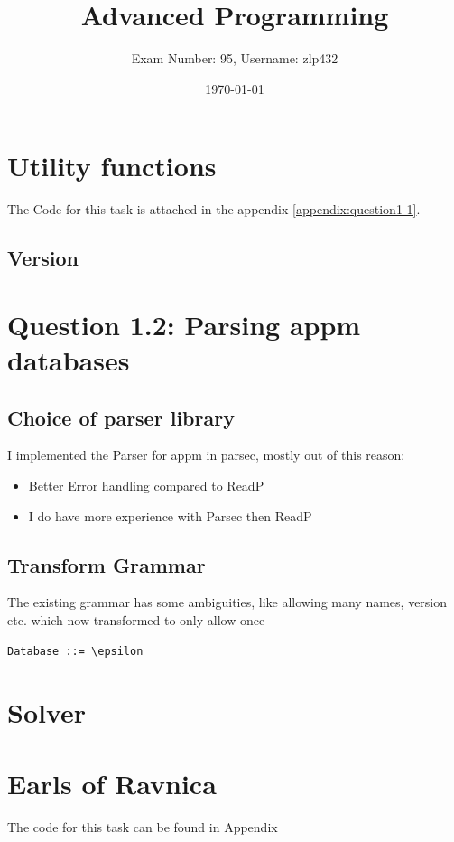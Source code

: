 \documentclass[12pt,a4paper]{article}
\newcommand{\subtitle}[1]{%
  \posttitle{%
    \par\end{center}
    \begin{center}\large#1\end{center}
    \vskip0.5em}%
}
\begin{document}
\title{Advanced Programming}
\subtitle{Exam 2018}

\author{Exam Number: 95, Username: zlp432}
\date{\today}
	
\maketitle
\tableofcontents

\section{Utility functions}
The Code for this task is attached in the appendix \ref{appendix:question1-1}.

\subsection{Version}


\section{Question 1.2: Parsing appm databases}
\subsection{Choice of parser library}
I implemented the Parser for appm in parsec, mostly out of this reason:
\begin{itemize}
	\item Better Error handling compared to ReadP
	\item I do have more experience with Parsec then ReadP
\end{itemize}

\subsection{Transform Grammar}
The existing grammar has some ambiguities, like allowing many names, version etc. which now transformed to only allow once
\begin{verbatim}
Database ::= \epsilon

\end{verbatim}

\section{Solver
}

\section{Earls of Ravnica}
The code for this task can be found in Appendix
\end{document}
